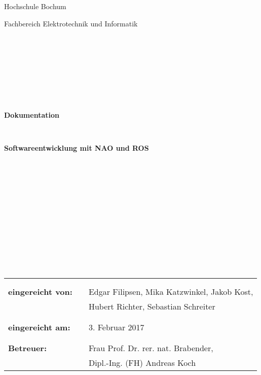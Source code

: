 \documentclass{scrartcl}
\begin{document}
\thispagestyle{empty}
\begin{center}
\Large{Hochschule Bochum}\\
\end{center}


\begin{center}
\Large{Fachbereich Elektrotechnik und Informatik}
\end{center}
\begin{verbatim}









\end{verbatim}
\begin{center}
\textbf{\LARGE{Dokumentation}}
\end{center}
\begin{verbatim}


\end{verbatim}
\begin{center}
\textbf{Softwareentwicklung mit NAO und ROS}
\end{center}
\begin{verbatim}














\end{verbatim}

\begin{flushleft}
\begin{tabular}{lll}

& & \\
& & \\
\textbf{eingereicht von:} & & Edgar Filipsen, Mika Katzwinkel, Jakob Kost,\\
 & &  Hubert Richter, Sebastian Schreiter\\
& & \\
& & \\
\textbf{eingereicht am:} & & 3. Februar 2017\\
& & \\
& & \\
\textbf{Betreuer:} & & Frau Prof. Dr. rer. nat. Brabender,\\
& & Dipl.-Ing. (FH) Andreas Koch
\end{tabular}
\end{flushleft}
\end{document}
